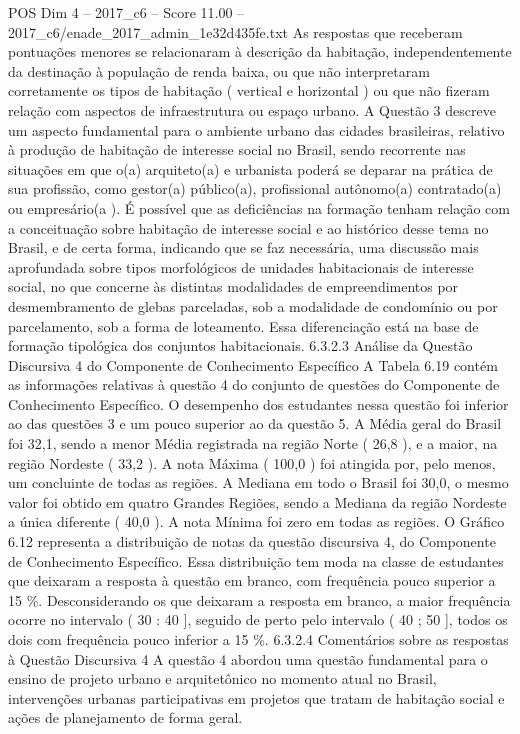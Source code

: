 \begin{textsample}{POS Dim 4 – 2017\_c6 – Score 11.00 – 2017\_c6/enade\_2017\_admin\_1e32d435fe.txt}
As respostas que receberam pontuações menores se relacionaram à descrição da habitação, independentemente da destinação à população de renda baixa, ou que não interpretaram corretamente os tipos de habitação ( vertical e horizontal ) ou que não fizeram relação com aspectos de infraestrutura ou espaço urbano.
A Questão 3 descreve um aspecto fundamental para o ambiente urbano das cidades brasileiras, relativo à produção de habitação de interesse social no Brasil, sendo recorrente nas situações em que o(a) arquiteto(a) e urbanista poderá se deparar na prática de sua profissão, como gestor(a) público(a), profissional autônomo(a) contratado(a) ou empresário(a ).
É possível que as deficiências na formação tenham relação com a conceituação sobre habitação de interesse social e ao histórico desse tema no Brasil, e de certa forma, indicando que se faz necessária, uma discussão mais aprofundada sobre tipos morfológicos de unidades habitacionais de interesse social, no que concerne às distintas modalidades de empreendimentos por desmembramento de glebas parceladas, sob a modalidade de condomínio ou por parcelamento, sob a forma de loteamento.
Essa diferenciação está na base de formação tipológica dos conjuntos habitacionais. 6.3.2.3 Análise da Questão Discursiva 4 do Componente de Conhecimento Específico A Tabela 6.19 contém as informações relativas à questão 4 do conjunto de questões do Componente de Conhecimento Específico.
O desempenho dos estudantes nessa questão foi inferior ao das questões 3 e um pouco superior ao da questão 5.
A Média geral do Brasil foi 32,1, sendo a menor Média registrada na região Norte ( 26,8 ), e a maior, na região Nordeste ( 33,2 ).
A nota Máxima ( 100,0 ) foi atingida por, pelo menos, um concluinte de todas as regiões.
A Mediana em todo o Brasil foi 30,0, o mesmo valor foi obtido em quatro Grandes Regiões, sendo a Mediana da região Nordeste a única diferente ( 40,0 ).
A nota Mínima foi zero em todas as regiões.
O Gráfico 6.12 representa a distribuição de notas da questão discursiva 4, do Componente de Conhecimento Específico.
Essa distribuição tem moda na classe de estudantes que deixaram a resposta à questão em branco, com frequência pouco superior a 15 \%.
Desconsiderando os que deixaram a resposta em branco, a maior frequência ocorre no intervalo ( 30 : 40 ], seguido de perto pelo intervalo ( 40 ; 50 ], todos os dois com frequência pouco inferior a 15 \%. 6.3.2.4 Comentários sobre as respostas à Questão Discursiva 4 A questão 4 abordou uma questão fundamental para o ensino de projeto urbano e arquitetônico no momento atual no Brasil, intervenções urbanas participativas em projetos que tratam de habitação social e ações de planejamento de forma geral.

\end{textsample}
